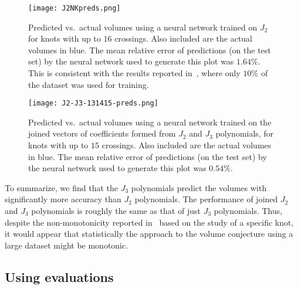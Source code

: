 \documentclass[11pt]{article}
\begin{document}
\begin{figure}[h] 
  \begin{center}
    \texttt{[image: J2NKpreds.png]}
  \end{center}
  \caption{{\textsf{Predicted vs.\ actual volumes using a neural network trained on $J_2$ for knots with up to $16$ crossings. Also included are the actual volumes in blue. The mean relative error of predictions (on the test set) by the neural network used to generate this plot was $1.64\%$. This is consistent with the results reported in~\cite{Jejjala:2019kio, Craven:2020bdz}, where only $10\%$ of the dataset was used for training.}}}  \label{fig:J2poly131415preds}
\end{figure}

\begin{figure}[h] 
  \begin{center}
    \texttt{[image: J2-J3-131415-preds.png]}
  \end{center}
  \caption{{\textsf{Predicted vs.\ actual volumes using a neural network trained on the joined vectors of coefficients formed from $J_2$ and $J_3$ polynomials, for knots with up to $15$ crossings. Also included are the actual volumes in blue. The mean relative error of predictions (on the test set) by the neural network used to generate this plot was $0.54\%$.}}}  \label{fig:J2J3poly131415preds}
\end{figure}

To summarize, we find that the $J_3$ polynomials predict the volumes with significantly more accuracy than $J_2$ polynomials.
The performance of joined $J_2$ and $J_3$ polynomials is roughly the same as that of just $J_3$ polynomials. 
Thus, despite the non-monotonicity reported in~\cite{Garoufalidis:2004} based on the study of a specific knot, it would appear that statistically the approach to the volume conjecture using a large dataset might be monotonic.

\subsection{Using evaluations}
\end{document}
